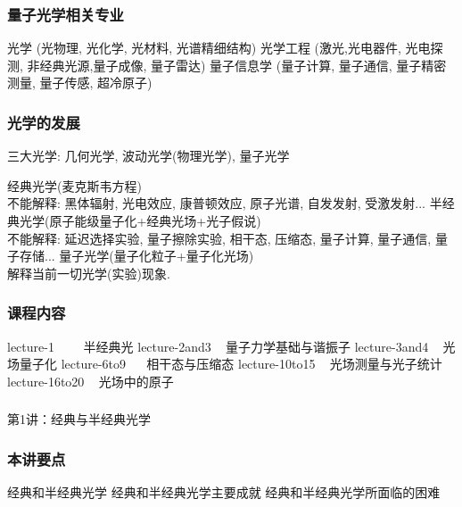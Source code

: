 \begin{frame}
      \frametitle{量子光学相关专业}
      \begin{itemize}
        \Item 光学 (光物理, 光化学, 光材料, 光谱精细结构)
        \Item 光学工程 (激光,光电器件, 光电探测, 非经典光源,量子成像, 量子雷达)  
        \Item 量子信息学 (量子计算, 量子通信, 量子精密测量, 量子传感,  超冷原子)    
    \end{itemize}  
\end{frame}

\begin{frame}
    \frametitle{光学的发展}
    三大光学: 几何光学, 波动光学(物理光学), 量子光学
    \begin{itemize}
        \Item 经典光学(麦克斯韦方程) \\
        不能解释: 黑体辐射, 光电效应, 康普顿效应, 原子光谱, 自发发射, 受激发射...
        \Item 半经典光学(原子能级量子化+经典光场+光子假说)  \\
        不能解释: 延迟选择实验, 量子擦除实验, 相干态, 压缩态, 量子计算, 量子通信, 量子存储...
        \Item 量子光学(量子化粒子+量子化光场)  \\
        解释当前一切光学(实验)现象. 
    \end{itemize}     
\end{frame}

\begin{frame}
    \frametitle{课程内容}
        \begin{enumerate}
            \Item lecture-1   ~~~~半经典光
            \Item lecture-2and3 ~ 量子力学基础与谐振子
            \Item lecture-3and4 ~ 光场量子化
            \Item lecture-6to9  ~~ 相干态与压缩态
            \Item lecture-10to15 ~ 光场测量与光子统计
            \Item lecture-16to20 ~ 光场中的原子
        \end{enumerate}
  \end{frame}

\begin{frame} [plain]
    \frametitle{}
    \Background[1] 
    \begin{center}
    {\huge 第1讲：经典与半经典光学}
    \end{center}  
    \addtocounter{framenumber}{-1}   
\end{frame}

\begin{frame}
      \frametitle{本讲要点}
      \begin{enumerate}
        \Item 经典和半经典光学
        \Item 经典和半经典光学主要成就
        \Item 经典和半经典光学所面临的困难
    \end{enumerate}
      
\end{frame}


